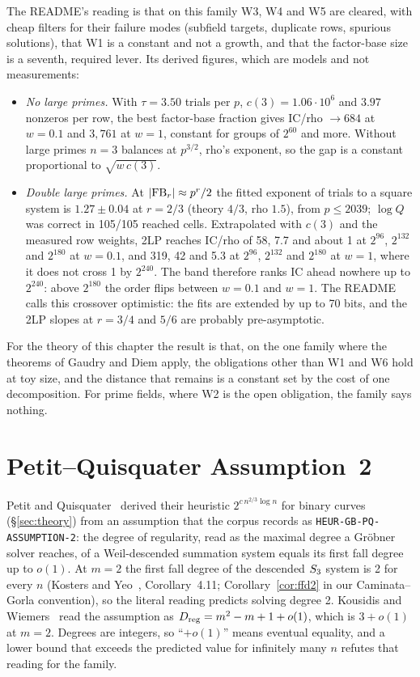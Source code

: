 The README's reading is that on this family W3, W4 and W5 are cleared, with
cheap filters for their failure modes (subfield targets, duplicate rows,
spurious solutions), that W1 is a constant and not a growth, and that the
factor-base size is a seventh, required lever. Its derived figures, which
are models and not measurements:
\begin{itemize}
\item \emph{No large primes.} With $\tau=3.50$ trials per $p$,
  $c(3)=1.06\cdot10^6$ and $3.97$ nonzeros per row, the best factor-base
  fraction gives IC/rho $\to684$ at $w=0.1$ and $3{,}761$ at $w=1$, constant
  for groups of $2^{60}$ and more. Without large primes $n=3$ balances at
  $p^{3/2}$, rho's exponent, so the gap is a constant proportional to
  $\sqrt{w\,c(3)}$.
\item \emph{Double large primes.} At $|{\rm FB}_r|\approx p^r/2$ the fitted
  exponent of trials to a square system is $1.27\pm0.04$ at $r=2/3$
  (theory $4/3$, rho $1.5$), from $p\le2039$; $\log Q$ was correct in
  105/105 reached cells. Extrapolated with $c(3)$ and the measured row
  weights, 2LP reaches IC/rho of 58, 7.7 and about 1 at $2^{96}$, $2^{132}$
  and $2^{180}$ at $w=0.1$, and 319, 42 and 5.3 at $2^{96}$, $2^{132}$ and
  $2^{180}$ at $w=1$, where it does not cross 1 by $2^{240}$. The band
  therefore ranks IC ahead nowhere up to $2^{240}$: above $2^{180}$ the order
  flips between $w=0.1$ and $w=1$. The README calls this crossover
  optimistic: the fits are extended by up to 70 bits, and the 2LP slopes at
  $r=3/4$ and $5/6$ are probably pre-asymptotic.
\end{itemize}
For the theory of this chapter the result is that, on the one family where
the theorems of Gaudry and Diem apply, the obligations other than W1 and W6
hold at toy size, and the distance that remains is a constant set by the
cost of one decomposition. For prime fields, where W2 is the open
obligation, the family says nothing.

\section{Petit--Quisquater Assumption~2}\label{sec:hd-pq2}

Petit and Quisquater~\cite{petit2012} derived their heuristic
$2^{c\,n^{2/3}\log n}$ for binary curves (\S\ref{sec:theory}) from an
assumption that the corpus records as
\texttt{HEUR-GB-PQ-ASSUMPTION-2}: the degree of regularity, read as the
maximal degree a Gröbner solver reaches, of a Weil-descended summation
system equals its first fall degree up to $o(1)$. At $m=2$ the first fall
degree of the descended $S_{3}$ system is 2 for every $n$ (Kosters and
Yeo~\cite{kosters2015notes}, Corollary~4.11; Corollary~\ref{cor:ffd2} in
our Caminata--Gorla convention), so the literal reading predicts solving
degree 2. Kousidis and Wiemers~\cite{kousidis2019} read the assumption as
$D_{\rm reg}=m^2-m+1+o(1)$, which is $3+o(1)$ at $m=2$. Degrees are
integers, so ``$+o(1)$'' means eventual equality, and a lower bound that
exceeds the predicted value for infinitely many $n$ refutes that reading
for the family.

